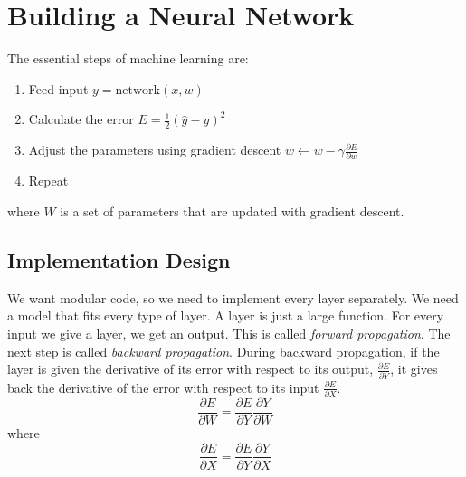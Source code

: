 \documentclass{article}
\begin{document}
\section{Building a Neural Network}
The essential steps of machine learning are:
\begin{enumerate}
	\item Feed input $y=\text{network}(x,w)$
	\item Calculate the error $E = \frac{1}{2}(\hat y-y)^2$
	\item Adjust the parameters using gradient descent $w \gets w - \gamma\frac{\partial E}{\partial w}$
	\item Repeat
\end{enumerate}
\noindent where $W$ is a set of parameters that are updated with gradient descent.

\subsection{Implementation Design}
We want modular code, so we need to implement every layer separately. We need a model that fits every type of layer. A layer 
is just a large function. For every input we give a layer, we get an output. This is called \textit{forward propagation}. 
The next step is called \textit{backward propagation}. During backward propagation, if the layer is given the derivative of 
its error with respect to its output, $\frac{\partial E}{\partial Y}$, it gives back the derivative of the error with respect to 
its input $\frac{\partial E}{\partial X}$.
\begin{equation}
	\displaystyle\frac{\partial E}{\partial W} = \displaystyle\frac{\partial E}{\partial Y}\displaystyle\frac{\partial Y}{\partial W}
	\label{eq:derivativeoferrorwrtparameter}
\end{equation}
\noindent where
\begin{equation}
	\displaystyle\frac{\partial E}{\partial X} = \displaystyle\frac{\partial E}{\partial Y}\displaystyle\frac{\partial Y}{\partial X}
	\label{eq:derivativeoferrorwrtinput}
\end{equation}
\end{document}
